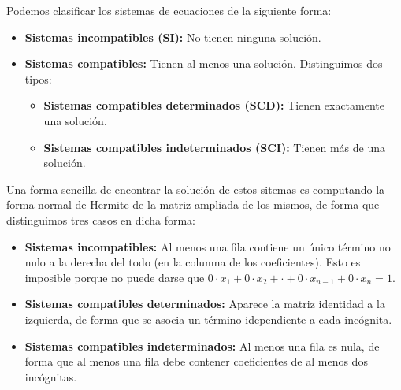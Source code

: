 Podemos clasificar los sistemas de ecuaciones de la siguiente forma:

\begin{itemize}
	\item\textbf{Sistemas incompatibles (SI):}
		No tienen ninguna solución.
	\item\textbf{Sistemas compatibles:}
		Tienen al menos una solución.
		Distinguimos dos tipos:
		\begin{itemize}
			\item\textbf{Sistemas compatibles determinados (SCD):}
				Tienen exactamente una solución.
			\item\textbf{Sistemas compatibles indeterminados (SCI):}
				Tienen más de una solución.
		\end{itemize}
\end{itemize}

Una forma sencilla de encontrar la solución de estos sitemas es computando la forma normal de Hermite de la matriz ampliada de los mismos, de forma que distinguimos tres casos en dicha forma:

\begin{itemize}
	\item\textbf{Sistemas incompatibles:}
		Al menos una fila contiene un único término no nulo a la derecha del todo (en la columna de los coeficientes).
		Esto es imposible porque no puede darse que $0 \cdot x_1 + 0 \cdot x_2 + \cdot + 0 \cdot x_{n-1} + 0 \cdot x_n = 1$.
	\item\textbf{Sistemas compatibles determinados:}
		Aparece la matriz identidad a la izquierda, de forma que se asocia un término idependiente a cada incógnita.
	\item\textbf{Sistemas compatibles indeterminados:}
		Al menos una fila es nula, de forma que al menos una fila debe contener coeficientes de al menos dos incógnitas.
\end{itemize}

